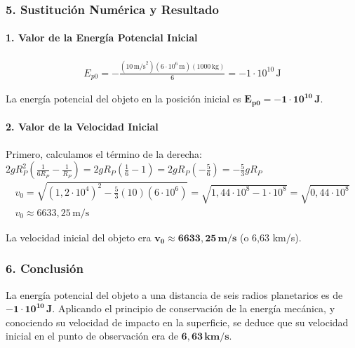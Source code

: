 \subsubsection*{5. Sustitución Numérica y Resultado}
\paragraph*{1. Valor de la Energía Potencial Inicial}
\begin{gather}
    E_{p0} = - \frac{(10 \, \text{m/s}^2) (6 \cdot 10^6 \, \text{m}) (1000 \, \text{kg})}{6} = -1 \cdot 10^{10} \, \text{J}
\end{gather}
\begin{cajaresultado}
    La energía potencial del objeto en la posición inicial es $\boldsymbol{E_{p0} = -1 \cdot 10^{10} \, \textbf{J}}$.
\end{cajaresultado}

\paragraph*{2. Valor de la Velocidad Inicial}
Primero, calculamos el término de la derecha:
$2 g R_P^2 \left( \frac{1}{6R_P} - \frac{1}{R_P} \right) = 2 g R_P \left( \frac{1}{6} - 1 \right) = 2 g R_P \left( -\frac{5}{6} \right) = -\frac{5}{3} g R_P$
\begin{gather}
    v_0 = \sqrt{(1,2 \cdot 10^4)^2 - \frac{5}{3} (10) (6 \cdot 10^6)} = \sqrt{1,44 \cdot 10^8 - 1 \cdot 10^8} = \sqrt{0,44 \cdot 10^8} \nonumber \\[8pt]
    v_0 \approx 6633,25 \, \text{m/s}
\end{gather}
\begin{cajaresultado}
    La velocidad inicial del objeto era $\boldsymbol{v_0 \approx 6633,25 \, \textbf{m/s}}$ (o 6,63 km/s).
\end{cajaresultado}

\subsubsection*{6. Conclusión}
\begin{cajaconclusion}
    La energía potencial del objeto a una distancia de seis radios planetarios es de $\mathbf{-1 \cdot 10^{10} \, J}$. Aplicando el principio de conservación de la energía mecánica, y conociendo su velocidad de impacto en la superficie, se deduce que su velocidad inicial en el punto de observación era de $\mathbf{6,63 \, km/s}$.
\end{cajaconclusion}

